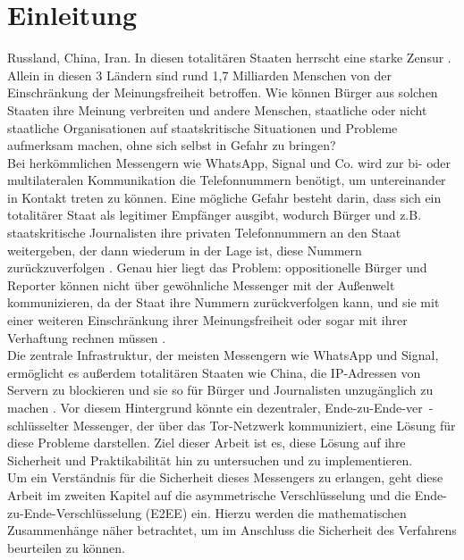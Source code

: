 \documentclass[a4paper,ngerman, headheight=28pt,12pt]{scrartcl}
\newcommand{\vcite}[1]{\cite[vgl.][]{#1}}
\begin{document}

\pagestyle{empty}
\tableofcontents
\clearpage
\pagestyle{plain}
%
\setcounter{page}{1}

\linenumbers{}
\modulolinenumbers[5]
\section{Einleitung}
Russland, China, Iran. In diesen totalitären Staaten herrscht eine starke Zensur \vcite{AmnReport}. Allein in diesen 3 Ländern sind rund 1,7 Milliarden Menschen von der Einschränkung der Meinungsfreiheit betroffen.
Wie können Bürger aus solchen Staaten ihre Meinung verbreiten und andere Menschen, staatliche oder nicht staatliche Organisationen auf staatskritische Situationen und Probleme aufmerksam machen, ohne sich selbst in Gefahr zu bringen? \\
Bei herkömmlichen Messengern wie WhatsApp, Signal und Co. wird zur bi- oder multilateralen Kommunikation die Telefonnummern benötigt, um untereinander in Kontakt treten zu können. Eine mögliche Gefahr besteht darin, dass sich ein totalitärer Staat als legitimer Empfänger ausgibt, wodurch Bürger und z.B. staatskritische Journalisten ihre privaten Telefonnummern an den Staat weitergeben, der dann wiederum in der Lage ist, diese Nummern zurückzuverfolgen \vcite{LocPolice}. Genau hier liegt das Problem: oppositionelle Bürger und Reporter können nicht über gewöhnliche Messenger mit der Außenwelt kommunizieren, da der Staat ihre Nummern zurückverfolgen kann, und sie mit einer weiteren Einschränkung ihrer Meinungsfreiheit oder sogar mit ihrer Verhaftung rechnen müssen \vcite{AmnReport}. \\
Die zentrale Infrastruktur, der meisten Messengern wie WhatsApp und Signal, ermöglicht es außerdem totalitären Staaten wie China, die IP-Adressen von Servern zu blockieren und sie so für Bürger und Journalisten unzugänglich zu machen \vcite{ChinaFirewall,CentralizedWhatsapp}.
Vor diesem Hintergrund könnte ein dezentraler, Ende-zu-Ende-ver~-schlüsselter Messenger, der über das Tor-Netzwerk kommuniziert, eine Lösung für diese Probleme darstellen. Ziel dieser Arbeit ist es, diese Lösung auf ihre Sicherheit und Praktikabilität hin zu untersuchen und zu implementieren.\\
Um ein Verständnis für die Sicherheit dieses Messengers zu erlangen, geht diese Arbeit im zweiten Kapitel auf die asymmetrische Verschlüsselung und die Ende-zu-Ende-Verschlüsselung (E2EE) ein. Hierzu werden die mathematischen Zusammenhänge näher betrachtet, um im Anschluss die Sicherheit des Verfahrens beurteilen zu können.
\end{document}

